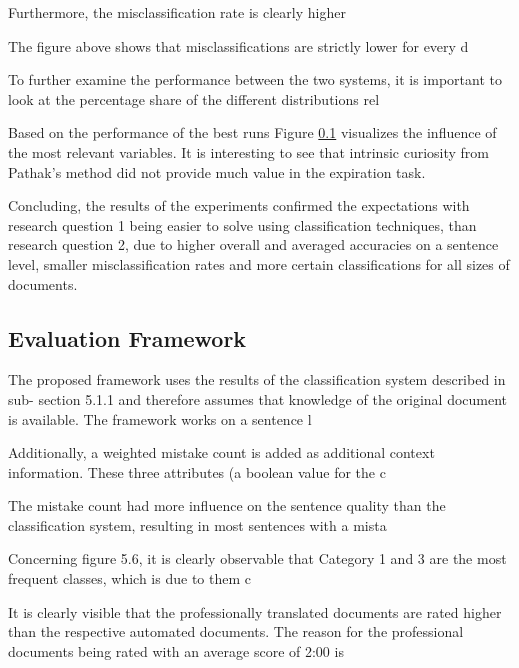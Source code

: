         
        Furthermore, the misclassiﬁcation rate is clearly higher 
        
        
        The ﬁgure above shows that misclassiﬁcations are strictly lower for every d
        
        
        To further examine the performance between the two systems, it is important to look at
        the percentage share of the different distributions rel
        
        Based on the performance of the best runs Figure \ref{} visualizes the influence of the most relevant variables.
        It is interesting to see that intrinsic curiosity from Pathak's method \cite{pathak2017curiosity} did not provide much value in the expiration task.
        
        
        Concluding, the results of the experiments conﬁrmed the expectations with research question
        1 being easier to solve using classiﬁcation techniques, than research question 2, due
        to higher overall and averaged accuracies on a sentence level, smaller misclassiﬁcation
        rates and more certain classiﬁcations for all sizes of documents.


    \subsection{Evaluation Framework}

        The proposed framework uses the results of the classiﬁcation system described in sub-
        section 5.1.1 and therefore assumes that knowledge of the original document is available.
        The framework works on a sentence l
        
        
        
        Additionally, a weighted mistake count is added as additional context information. These
        three attributes (a boolean value for the c
        
        
        The mistake count had more inﬂuence on the sentence quality than the classiﬁcation system,
        resulting in most sentences with a mista
        
        
        Concerning ﬁgure 5.6, it is clearly observable that Category 1 and 3 are the most frequent
        classes, which is due to them c
        
        
        It is clearly visible that the professionally translated documents are rated higher than the
        respective automated documents. The reason for the professional documents being rated
        with an average score of 2:00 is 
        
